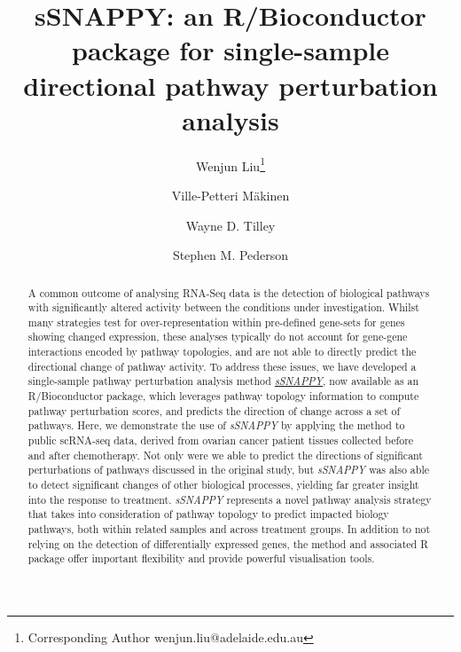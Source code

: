 \documentclass[9pt,a4paper,]{extarticle}
\begin{document}
\pagestyle{front}

\title{sSNAPPY: an R/Bioconductor package for single-sample directional pathway perturbation analysis}

\author[1]{Wenjun Liu\thanks{\ttfamily Corresponding Author wenjun.liu@adelaide.edu.au}}
\author[2,3]{Ville-Petteri Mäkinen}
\author[1]{Wayne D. Tilley}
\author[1,4,5]{Stephen M. Pederson}

\maketitle
\thispagestyle{front}

\begin{abstract}
A common outcome of analysing RNA-Seq data is the detection of biological pathways with significantly altered activity between the conditions under investigation. Whilst many strategies test for over-representation within pre-defined gene-sets for genes showing changed expression, these analyses typically do not account for gene-gene interactions encoded by pathway topologies, and are not able to directly predict the directional change of pathway activity. To address these issues, we have developed a single-sample pathway perturbation analysis method \href{https://bioconductor.org/packages/sSNAPPY}{\emph{sSNAPPY}}, now available as an R/Bioconductor package, which leverages pathway topology information to compute pathway perturbation scores, and predicts the direction of change across a set of pathways. Here, we demonstrate the use of \emph{sSNAPPY} by applying the method to public scRNA-seq data, derived from ovarian cancer patient tissues collected before and after chemotherapy. Not only were we able to predict the directions of significant perturbations of pathways discussed in the original study, but \emph{sSNAPPY} was also able to detect significant changes of other biological processes, yielding far greater insight into the response to treatment. \emph{sSNAPPY} represents a novel pathway analysis strategy that takes into consideration of pathway topology to predict impacted biology pathways, both within related samples and across treatment groups. In addition to not relying on the detection of differentially expressed genes, the method and associated R package offer important flexibility and provide powerful visualisation tools.
\end{abstract}
\end{document}
